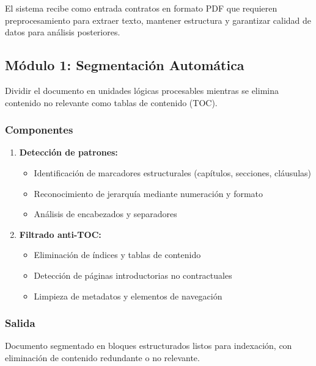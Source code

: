 \documentclass[12pt,a4paper]{article}
\begin{document}
El sistema recibe como entrada contratos en formato PDF que requieren preprocesamiento para extraer texto, mantener estructura y garantizar calidad de datos para análisis posteriores.

\subsection{Módulo 1: Segmentación Automática}

\begin{tcolorbox}[colback=lightblue!20, colframe=lightblue!80!black, title=Objetivos del Módulo 1]
Dividir el documento en unidades lógicas procesables mientras se elimina contenido no relevante como tablas de contenido (TOC).
\end{tcolorbox}

\subsubsection{Componentes}

\begin{enumerate}[leftmargin=*]
    \item \textbf{Detección de patrones:}
    \begin{itemize}
        \item Identificación de marcadores estructurales (capítulos, secciones, cláusulas)
        \item Reconocimiento de jerarquía mediante numeración y formato
        \item Análisis de encabezados y separadores
    \end{itemize}
    
    \item \textbf{Filtrado anti-TOC:}
    \begin{itemize}
        \item Eliminación de índices y tablas de contenido
        \item Detección de páginas introductorias no contractuales
        \item Limpieza de metadatos y elementos de navegación
    \end{itemize}
\end{enumerate}

\subsubsection{Salida}

Documento segmentado en bloques estructurados listos para indexación, con eliminación de contenido redundante o no relevante.
\end{document}
